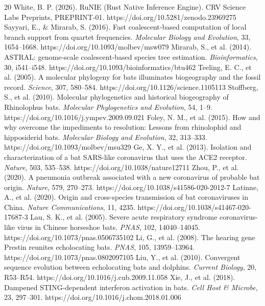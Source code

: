 \documentclass[10pt,letterpaper]{article}
\begin{document}
\begin{thebibliography}{20}
 White, B. P. (2026). RuNIE (Rust Native Inference Engine). CRV Science Labs Preprints, PREPRINT-01. https://doi.org/10.5281/zenodo.23969275
 Sayyari, E., \& Mirarab, S. (2016). Fast coalescent-based computation of local branch support from quartet frequencies. \emph{Molecular Biology and Evolution}, 33, 1654--1668. https://doi.org/10.1093/molbev/msw079
 Mirarab, S., et al. (2014). ASTRAL: genome-scale coalescent-based species tree estimation. \emph{Bioinformatics}, 30, i541--i548. https://doi.org/10.1093/bioinformatics/btu462
 Teeling, E. C., et al. (2005). A molecular phylogeny for bats illuminates biogeography and the fossil record. \emph{Science}, 307, 580--584. https://doi.org/10.1126/science.1105113
 Stoffberg, S., et al. (2010). Molecular phylogenetics and historical biogeography of Rhinolophus bats. \emph{Molecular Phylogenetics and Evolution}, 54, 1--9. https://doi.org/10.1016/j.ympev.2009.09.021
 Foley, N. M., et al. (2015). How and why overcome the impediments to resolution: Lessons from rhinolophid and hipposiderid bats. \emph{Molecular Biology and Evolution}, 32, 313--333. https://doi.org/10.1093/molbev/msu329
 Ge, X. Y., et al. (2013). Isolation and characterization of a bat SARS-like coronavirus that uses the ACE2 receptor. \emph{Nature}, 503, 535--538. https://doi.org/10.1038/nature12711
 Zhou, P., et al. (2020). A pneumonia outbreak associated with a new coronavirus of probable bat origin. \emph{Nature}, 579, 270--273. https://doi.org/10.1038/s41586-020-2012-7
 Latinne, A., et al. (2020). Origin and cross-species transmission of bat coronaviruses in China. \emph{Nature Communications}, 11, 4235. https://doi.org/10.1038/s41467-020-17687-3
 Lau, S. K., et al. (2005). Severe acute respiratory syndrome coronavirus-like virus in Chinese horseshoe bats. \emph{PNAS}, 102, 14040--14045. https://doi.org/10.1073/pnas.0506735102
 Li, G., et al. (2008). The hearing gene Prestin reunites echolocating bats. \emph{PNAS}, 105, 13959--13964. https://doi.org/10.1073/pnas.0802097105
 Liu, Y., et al. (2010). Convergent sequence evolution between echolocating bats and dolphins. \emph{Current Biology}, 20, R53--R54. https://doi.org/10.1016/j.cub.2009.11.058
 Xie, J., et al. (2018). Dampened STING-dependent interferon activation in bats. \emph{Cell Host \& Microbe}, 23, 297--301. https://doi.org/10.1016/j.chom.2018.01.006

\end{thebibliography}
\end{document}
